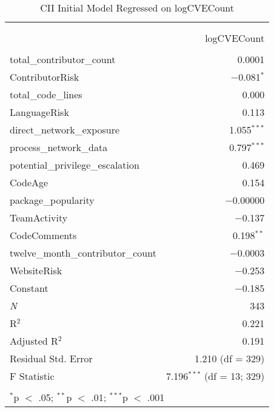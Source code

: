 \begin{table}[!htbp] \centering 
	\caption{CII Initial Model Regressed on logCVECount} 
	\label{tab:cii_initial_regression} 
	\begin{tabular}{@{\extracolsep{5pt}}lr} 
		\\[-1.8ex]\hline \\[-1.8ex] 
		\\[-1.8ex] & logCVECount \\ 
		\hline \\[-1.8ex] 
		total\_contributor\_count & 0.0001 \\ 
		ContributorRisk & $-$0.081$^{*}$ \\ 
		total\_code\_lines & 0.000 \\ 
		LanguageRisk & 0.113 \\ 
		direct\_network\_exposure & 1.055$^{***}$ \\ 
		process\_network\_data & 0.797$^{***}$ \\ 
		potential\_privilege\_escalation & 0.469 \\ 
		CodeAge & 0.154 \\ 
		package\_popularity & $-$0.00000 \\ 
		TeamActivity & $-$0.137 \\ 
		CodeComments & 0.198$^{**}$ \\ 
		twelve\_month\_contributor\_count & $-$0.0003 \\ 
		WebsiteRisk & $-$0.253 \\ 
		Constant & $-$0.185 \\ 
		\textit{N} & 343 \\ 
		R$^{2}$ & 0.221 \\ 
		Adjusted R$^{2}$ & 0.191 \\ 
		Residual Std. Error & 1.210 (df = 329) \\ 
		F Statistic & 7.196$^{***}$ (df = 13; 329) \\ 
		\hline \\[-1.8ex] 
		\multicolumn{2}{l}{$^{*}$p $<$ .05; $^{**}$p $<$ .01; $^{***}$p $<$ .001} \\ 
	\end{tabular} 
\end{table}


